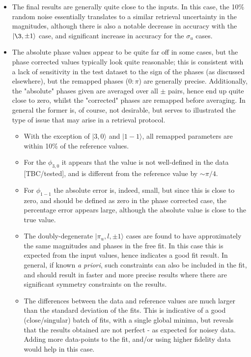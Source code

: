 \begin{itemize}
\item The final results are generally quite close to the inputs. In this case, the 10\% random noise essentially translates to a similar retrieval uncertainty in the magnitudes, although there is also a notable decrease in accuracy with the $|\3,\pm1\rangle$ case, and significant increase in accuracy for the $\sigma_u$ cases.
\item The absolute phase values appear to be quite far off in some cases, but the phase corrected values typically look quite reasonable; this is consistent with a lack of sensitivity in the test dataset to the sign of the phases (as discussed elsewhere), but the remapped phases ($0:\pi$) are generally precise. Additionally, the "absolute" phases given are averaged over all $\pm$ pairs, hence end up quite close to zero, whilst the "corrected" phases are remapped before averaging. In general the former is, of course, not desirable, but serves to illustrated the type of issue that may arise in a retrieval protocol.
\begin{itemize}
\item With the exception of $|3,0\rangle$ and $|1-1\rangle$, all remapped parameters are within 10\% of the reference values.
\item For the $\phi_{3,0}$ it appears that the value is not well-defined in the data [TBC/tested], and is different from the reference value by $\sim\pi/4$.
\item For $\phi_{1-1}$ the absolute error is, indeed, small, but since this is close to zero, and should be defined as zero in the phase corrected case, the percentage error appears large, although the absolute value is close to the true value.
\item The doubly-degenerate $|\pi_u,l,\pm1\rangle$ cases are found to have approximately the same magnitudes and phases in the free fit. In this case this is expected from the input values, hence indicates a good fit result. In general, if known \textit{a priori}, such constraints can also be included in the fit, and should result in faster and more precise results where there are significant symmetry constraints on the results.
\item The differences between the data and reference values are much larger than the standard deviation of the fits. This is indicative of a good (close/singular) batch of fits, with a single global minima, but reveals that the results obtained are not perfect - as expected for noisey data. Adding more data-points to the fit, and/or using higher fidelity data would help in this case.

\end{itemize}
\end{itemize}
